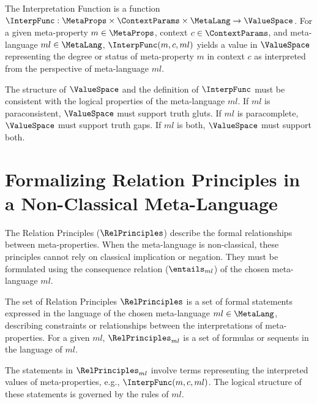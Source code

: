 					\begin{definition}
						The Interpretation Function is a function $\InterpFunc: \MetaProps \times \ContextParams \times \MetaLang \rightarrow \ValueSpace$. For a given meta-property $m \in \MetaProps$, context $c \in \ContextParams$, and meta-language $ml \in \MetaLang$, $\InterpFunc(m, c, ml)$ yields a value in $\ValueSpace$ representing the degree or status of meta-property $m$ in context $c$ as interpreted from the perspective of meta-language $ml$.
					\end{definition}
					
					\begin{remark}
						\RaggedRight %
						The structure of $\ValueSpace$ and the definition of $\InterpFunc$ must be consistent with the logical properties of the meta-language $ml$. If $ml$ is paraconsistent, $\ValueSpace$ must support truth gluts. If $ml$ is paracomplete, $\ValueSpace$ must support truth gaps. If $ml$ is both, $\ValueSpace$ must support both.
						\end{remark}
							
							\section{Formalizing Relation Principles in a Non-Classical Meta-Language}
							
							The Relation Principles ($\RelPrinciples$) describe the formal relationships between meta-properties. When the meta-language is non-classical, these principles cannot rely on classical implication or negation. They must be formulated using the consequence relation ($\entails_{ml}$) of the chosen meta-language $ml$.
							
							\begin{definition}
								The set of Relation Principles $\RelPrinciples$ is a set of formal statements expressed in the language of the chosen meta-language $ml \in \MetaLang$, describing constraints or relationships between the interpretations of meta-properties. For a given $ml$, $\RelPrinciples_{ml}$ is a set of formulas or sequents in the language of $ml$.
								\end{definition}
									
									The statements in $\RelPrinciples_{ml}$ involve terms representing the interpreted values of meta-properties, e.g., $\InterpFunc(m, c, ml)$. The logical structure of these statements is governed by the rules of $ml$.
									
